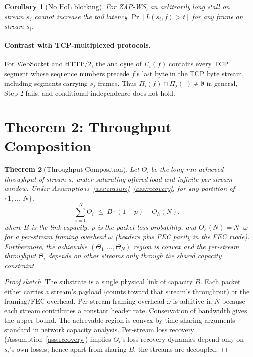 \documentclass[11pt,a4paper]{article}
\newtheorem{theorem}{Theorem}
\newtheorem{corollary}[theorem]{Corollary}
\begin{document}
\begin{corollary}[No HoL blocking]
For ZAP-WS, an arbitrarily long stall on stream $s_j$ cannot increase
the tail latency $\Pr[L(s_i, f) > t]$ for any frame on stream $s_i$.
\end{corollary}

\paragraph{Contrast with TCP-multiplexed protocols.} For WebSocket and
HTTP/2, the analogue of $\Pi_i(f)$ contains every TCP segment whose
sequence numbers precede $f$'s last byte in the TCP byte stream,
including segments carrying $s_j$ frames. Thus
$\Pi_i(f) \cap \Pi_j(\cdot) \ne \emptyset$ in general, Step 2 fails,
and conditional independence does not hold.

\section{Theorem 2: Throughput Composition}

\begin{theorem}[Throughput Composition]\label{thm:throughput}
Let $\Theta_i$ be the long-run achieved throughput of stream $s_i$ under
saturating offered load and infinite per-stream window. Under
Assumptions~\ref{ass:erasure}--\ref{ass:recovery}, for any partition of
$\{1, \ldots, N\}$,
\[
\sum_{i=1}^N \Theta_i \;\le\; B \cdot (1 - p) - O_h(N),
\]
where $B$ is the link capacity, $p$ is the packet loss probability, and
$O_h(N) = N \cdot \omega$ for a per-stream framing overhead $\omega$
(headers plus FEC parity in the FEC mode). Furthermore, the achievable
$(\Theta_1, \ldots, \Theta_N)$ region is convex and the per-stream
throughput $\Theta_i$ depends on other streams \emph{only} through the
shared capacity constraint.
\end{theorem}

\begin{proof}[Proof sketch]
The substrate is a single physical link of capacity $B$. Each packet
either carries a stream's payload (counts toward that stream's
throughput) or the framing/FEC overhead. Per-stream framing overhead
$\omega$ is additive in $N$ because each stream contributes a constant
header rate. Conservation of bandwidth gives the upper bound. The
achievable region is convex by time-sharing arguments standard in
network capacity analysis. Per-stream loss recovery
(Assumption~\ref{ass:recovery}) implies $\Theta_i$'s loss-recovery
dynamics depend only on $s_i$'s own losses; hence apart from sharing
$B$, the streams are decoupled.
\end{proof}
\end{document}
